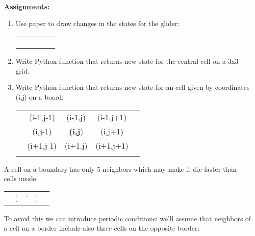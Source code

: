 \begin{tcolorbox}
\textbf{Assignments:}
\begin{enumerate}
\item Use paper to draw changes in the states for the glider:
\begin{center}
\begin{tabular}{c|c|c|c|c}
 & & & & \\
\hline
 & & \cellcolor{black} & & \\
\hline
 & & & \cellcolor{black} & \\
\hline
 & \cellcolor{black} & \cellcolor{black} & \cellcolor{black} & \\
\hline
 & & & & 
\end{tabular}
\end{center}
\item Write Python function that returns new state for the central cell
on a 3x3 grid.
\item Write Python function that returns new state for an cell
given by coordinates (i,j) on a board:

\begin{center}
\begin{tabular}{c|c|c|c|c}
 & & & & \\
\hline
 & (i-1,j-1) & (i-1,j) & (i-1,j+1) & \\
\hline
 & (i,j-1) & \textbf{(i,j}) & (i,j+1) & \\
\hline
 & (i+1,j-1) & (i+1,j) & (i+1,j+1) & \\
\hline
 & & & & 
\end{tabular}
\end{center}

\end{enumerate}
\end{tcolorbox}

A cell on a boundary has only 5 neighbors
which may make it die faster than cells inside:

\begin{center}
\begin{tabular}{c|c|c|c|c}
 & & & & \\
\hline
 & & & & \\
\hline
 & $\cdot$ & $\cdot$ & $\cdot$ & \\
\hline
 & $\cdot$ & \cellcolor{black} & $\cdot$ & \\
\hline
\end{tabular}
\end{center}

To avoid this we can
introduce periodic conditions: we'll assume that neighbors of a cell
on a border include also three cells on the opposite border:

